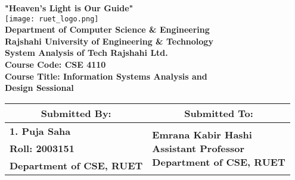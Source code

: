 \documentclass[12pt,a4paper]{article}
\begin{document}

\begin{titlepage}
    \thispagestyle{titlepage}
    \centering
    \vspace*{0.5cm}
    {\large \textbf{"Heaven's Light is Our Guide"}}\\[0.3cm]
    \texttt{[image: ruet\_logo.png]} \\[0.4cm]
    {\Large \textbf{Department of Computer Science \& Engineering}}\\[0.3cm]
    {\large \textbf{Rajshahi University of Engineering \& Technology}}\\[0.8cm]
    \vspace{0.8cm}
    {\LARGE \textbf{System Analysis of Tech Rajshahi Ltd.}}\\[0.2cm]
    \vspace{0.8cm}
    {\Large \textbf{Course Code: CSE 4110}}\\[0.2cm]
    \vspace{0.3cm}
    {\Large \textbf{Course Title: Information Systems Analysis and}}\\
    \vspace{0.3cm}
    {\Large \hspace{-1.0cm}\textbf{Design Sessional}}\\[0.8cm]
\begin{table}[h!]
    \centering
    \setlength{\arrayrulewidth}{1.5pt}
    \renewcommand{\arraystretch}{1.3}
    \begin{tabular}{|p{7.5cm}|p{7.5cm}|}
        \hline
        \multicolumn{1}{|c|}{\large \textbf{Submitted By:}} & \multicolumn{1}{c|}{\large \textbf{Submitted To:}} \\
        \hline
        \large \textbf{1. Puja Saha} & \multirow{10}{*}{\parbox{7.5cm}{\centering 
        \large \textbf{Emrana Kabir Hashi} \\ 
        \vspace{0.1cm}
        \textbf{Assistant Professor} \\ 
        \vspace{0.1cm}
        \textbf{Department of CSE, RUET}}} \\
        \large \quad \textbf{\hspace{0.2cm}Roll: 2003151} & \\
        \large \quad \textbf{\hspace{0.2cm}Department of CSE, RUET} & \\

\end{tabular}
\end{table}
\end{titlepage}
\end{document}

